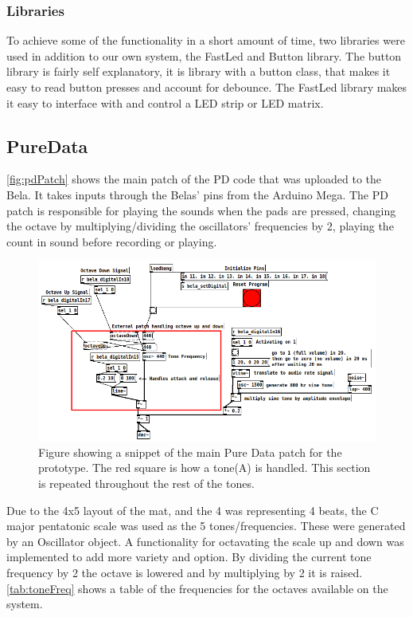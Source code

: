 		\subsubsection{Libraries}%
			To achieve some of the functionality in a short amount of time, two libraries were used in addition to our own system,
			the FastLed and Button library. The button library is fairly self explanatory, it is library with a button class, that makes it easy to read button presses and account for debounce. The FastLed library makes it easy to interface with and control a LED strip or LED matrix.
	\subsection{PureData}%
		\autoref{fig:pdPatch} shows the main patch of the PD code that was uploaded to the Bela. It takes inputs through the Belas' pins from the Arduino Mega. The PD patch is responsible for playing the sounds when the pads are pressed, changing the octave by multiplying/dividing the oscillators' frequencies by 2, playing the count in sound before recording or playing.
	
	\begin{figure}[H]
		\centering
		\includegraphics[width=1\linewidth]{figure/Implementation/pureDataPatch}
		\caption{Figure showing a snippet of the main Pure Data patch for the prototype. The red square is how a tone(A) is handled. This section is repeated throughout the rest of the tones.}
		\label{fig:pdPatch}
	\end{figure}
	\noindent
	Due to the 4x5 layout of the mat, and the 4 was representing 4 beats, the C major pentatonic scale was used as the 5 tones/frequencies. These were generated by an Oscillator object. A functionality for octavating the scale up and down was implemented to add more variety and option. By dividing the current tone frequency by 2 the octave is lowered and by multiplying by 2 it is raised. \autoref{tab:toneFreq} shows a table of the frequencies for the octaves available on the system.
	
